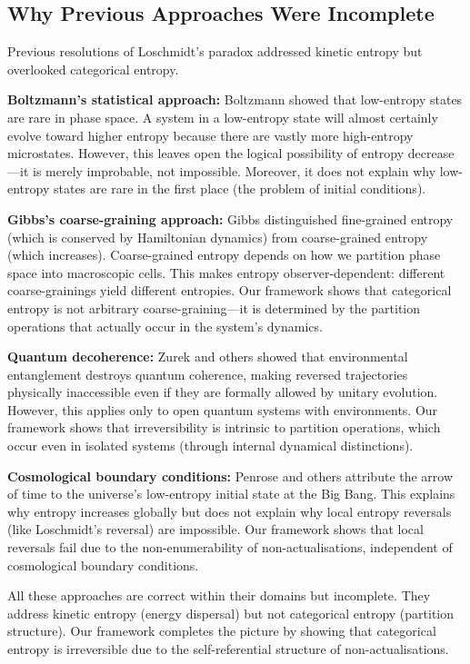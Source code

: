 \documentclass[twocolumn,10pt]{article}
\theoremstyle{definition}
\theoremstyle{remark}
\begin{document}
\subsection{Why Previous Approaches Were Incomplete}

Previous resolutions of Loschmidt's paradox addressed kinetic entropy but overlooked categorical entropy.

\textbf{Boltzmann's statistical approach:} Boltzmann showed that low-entropy states are rare in phase space. A system in a low-entropy state will almost certainly evolve toward higher entropy because there are vastly more high-entropy microstates. However, this leaves open the logical possibility of entropy decrease—it is merely improbable, not impossible. Moreover, it does not explain why low-entropy states are rare in the first place (the problem of initial conditions).

\textbf{Gibbs's coarse-graining approach:} Gibbs distinguished fine-grained entropy (which is conserved by Hamiltonian dynamics) from coarse-grained entropy (which increases). Coarse-grained entropy depends on how we partition phase space into macroscopic cells. This makes entropy observer-dependent: different coarse-grainings yield different entropies. Our framework shows that categorical entropy is not arbitrary coarse-graining—it is determined by the partition operations that actually occur in the system's dynamics.

\textbf{Quantum decoherence:} Zurek and others showed that environmental entanglement destroys quantum coherence, making reversed trajectories physically inaccessible even if they are formally allowed by unitary evolution. However, this applies only to open quantum systems with environments. Our framework shows that irreversibility is intrinsic to partition operations, which occur even in isolated systems (through internal dynamical distinctions).

\textbf{Cosmological boundary conditions:} Penrose and others attribute the arrow of time to the universe's low-entropy initial state at the Big Bang. This explains why entropy increases globally but does not explain why local entropy reversals (like Loschmidt's reversal) are impossible. Our framework shows that local reversals fail due to the non-enumerability of non-actualisations, independent of cosmological boundary conditions.

All these approaches are correct within their domains but incomplete. They address kinetic entropy (energy dispersal) but not categorical entropy (partition structure). Our framework completes the picture by showing that categorical entropy is irreversible due to the self-referential structure of non-actualisations.
\end{document}
